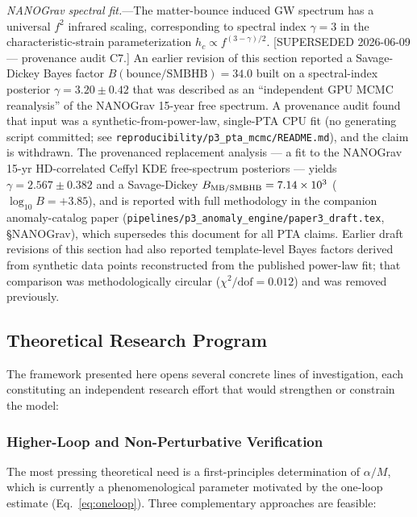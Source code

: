 \documentclass[aps,prd,twocolumn,superscriptaddress,showpacs,preprintnumbers,nofootinbib,longbibliography,floatfix]{revtex4-2}
\begin{document}
\textit{NANOGrav spectral fit.}---The matter-bounce induced GW spectrum has a universal $f^2$ infrared scaling, corresponding to spectral index $\gamma = 3$ in the characteristic-strain parameterization $h_c \propto f^{(3-\gamma)/2}$. [SUPERSEDED 2026-06-09 --- provenance audit C7.] An earlier revision of this section reported a Savage-Dickey Bayes factor $B(\text{bounce}/\text{SMBHB}) = 34.0$ built on a spectral-index posterior $\gamma = 3.20 \pm 0.42$ that was described as an ``independent GPU MCMC reanalysis'' of the NANOGrav 15-year free spectrum. A provenance audit found that input was a synthetic-from-power-law, single-PTA CPU fit (no generating script committed; see \texttt{reproducibility/p3\_pta\_mcmc/README.md}), and the claim is withdrawn. The provenanced replacement analysis --- a fit to the NANOGrav 15-yr HD-correlated Ceffyl KDE free-spectrum posteriors --- yields $\gamma = 2.567 \pm 0.382$ and a Savage-Dickey $B_{\rm MB/SMBHB} = 7.14\times 10^{3}$ ($\log_{10}B = +3.85$), and is reported with full methodology in the companion anomaly-catalog paper (\texttt{pipelines/p3\_anomaly\_engine/paper3\_draft.tex}, \S NANOGrav), which supersedes this document for all PTA claims. Earlier draft revisions of this section had also reported template-level Bayes factors derived from synthetic data points reconstructed from the published power-law fit; that comparison was methodologically circular ($\chi^2/\text{dof} = 0.012$) and was removed previously.

\subsection{Theoretical Research Program}\label{sec:theory_program}

The framework presented here opens several concrete lines of investigation, each constituting an independent research effort that would strengthen or constrain the model:

\subsubsection{Higher-Loop and Non-Perturbative Verification}

The most pressing theoretical need is a first-principles determination of $\alpha/M$, which is currently a phenomenological parameter motivated by the one-loop estimate (Eq.~\ref{eq:oneloop}). Three complementary approaches are feasible:
\end{document}
